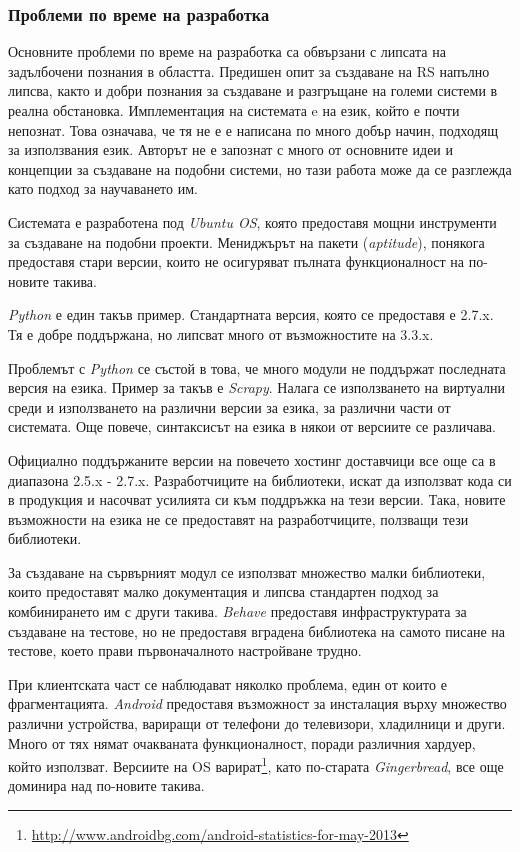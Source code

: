 \subsubsection{Проблеми по време на разработка}

	Основните проблеми по време на разработка са обвързани с липсата на задълбочени познания в областта. Предишен опит за създаване на \ac{RS} напълно липсва, както и добри познания за създаване и разгръщане на големи системи в реална обстановка. Имплементация на системата e на език, който е почти непознат. Това означава, че тя не е е написана по много добър начин, подходящ за използвания език. Авторът не е запознат с много от основните идеи и концепции за създаване на подобни системи, но тази работа може да се разглежда като подход за научаването им.

	Системата е разработена под \emph{Ubuntu \ac{OS}}, която предоставя мощни инструменти за създаване на подобни проекти. Мениджърът на пакети (\emph{aptitude}), понякога предоставя стари версии, които не осигуряват пълната функционалност на по-новите такива.
	
	\emph{Python} е един такъв пример. Стандартната версия, която се предоставя е 2.7.x. Тя е добре поддържана, но липсват много от възможностите на 3.3.x. 
	
	Проблемът с \emph{Python} се състой в това, че много модули не поддържат последната версия на езика. Пример за такъв е \emph{Scrapy}. Налага се използването на виртуални среди и използването на различни версии за езика, за различни части от системата. Още повече, синтаксисът на езика в някои от версиите се различава.
	
	Официално поддържаните версии на повечето хостинг доставчици все още са в диапазона 2.5.x - 2.7.x. Разработчиците на библиотеки, искат да използват кода си в продукция и насочват усилията си към поддръжка на тези версии. Така, новите възможности на езика не се предоставят на разработчиците, ползващи тези библиотеки.
	
	За създаване на сървърният модул се използват множество малки библиотеки, които предоставят малко документация и липсва стандартен подход за комбинирането им с други такива. \emph{Behave} предоставя инфраструктурата за създаване на тестове, но не предоставя вградена библиотека на самото писане на тестове, което прави първоначалното настройване трудно.
	
	При клиентската част се наблюдават няколко проблема, един от които е фрагментацията. \emph{Android} предоставя възможност за инсталация върху множество различни устройства, вариращи от телефони до телевизори, хладилници и други. Много от тях нямат очакваната функционалност, поради различния хардуер, който използват. Версиите на \ac{OS} варират\footnote{\url{http://www.androidbg.com/android-statistics-for-may-2013}}, като по-старата \emph{Gingerbread}, все още доминира над по-новите такива.
	
